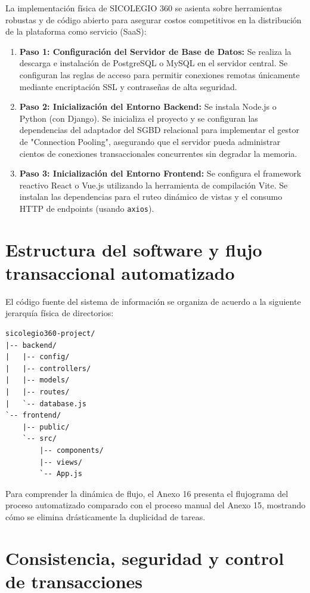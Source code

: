 \documentclass[12pt,a4paper,oneside]{report}
\begin{document}
La implementación física de SICOLEGIO 360 se asienta sobre herramientas robustas y de código abierto para asegurar costos competitivos en la distribución de la plataforma como servicio (SaaS):
\begin{enumerate}
    \item \textbf{Paso 1: Configuración del Servidor de Base de Datos:} Se realiza la descarga e instalación de PostgreSQL o MySQL en el servidor central. Se configuran las reglas de acceso para permitir conexiones remotas únicamente mediante encriptación SSL y contraseñas de alta seguridad.
    \item \textbf{Paso 2: Inicialización del Entorno Backend:} Se instala Node.js o Python (con Django). Se inicializa el proyecto y se configuran las dependencias del adaptador del SGBD relacional para implementar el gestor de "Connection Pooling", asegurando que el servidor pueda administrar cientos de conexiones transaccionales concurrentes sin degradar la memoria.
    \item \textbf{Paso 3: Inicialización del Entorno Frontend:} Se configura el framework reactivo React o Vue.js utilizando la herramienta de compilación Vite. Se instalan las dependencias para el ruteo dinámico de vistas y el consumo HTTP de endpoints (usando \texttt{axios}).
\end{enumerate}

\section{Estructura del software y flujo transaccional automatizado}

El código fuente del sistema de información se organiza de acuerdo a la siguiente jerarquía física de directorios:
\begin{verbatim}
sicolegio360-project/
|-- backend/
|   |-- config/            
|   |-- controllers/       
|   |-- models/            
|   |-- routes/            
|   `-- database.js        
`-- frontend/
    |-- public/            
    `-- src/
        |-- components/    
        |-- views/         
        `-- App.js         
\end{verbatim}

Para comprender la dinámica de flujo, el Anexo 16 presenta el flujograma del proceso automatizado comparado con el proceso manual del Anexo 15, mostrando cómo se elimina drásticamente la duplicidad de tareas.

\section{Consistencia, seguridad y control de transacciones}
\end{document}
